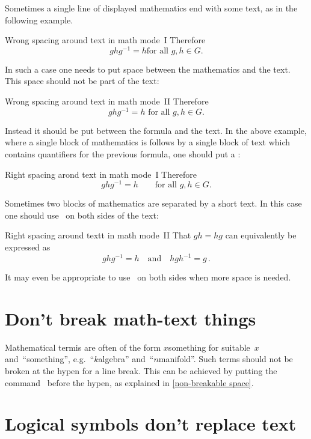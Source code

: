 Sometimes a single line of displayed mathematics end with some text, as in the following example.
\begin{showlatex}{Wrong spacing around text in math mode~I}
Therefore
\[
  g h g^{-1}
  =
  h
  \text{for all $g, h \in G$}.
\]
\end{showlatex}
In such a case one needs to put space between the mathematics and the text.
This space should not be part of the text:
\begin{showlatex}{Wrong spacing around text in math mode~II}
Therefore
\[
  g h g^{-1}
  =
  h
  \text{ for all $g, h \in G$.}
\]
\end{showlatex}
Instead it should be put between the formula and the text.
In the above example, where a single block of mathematics is follows by a single block of text which contains quantifiers for the previous formula, one should put a :
\begin{showlatex}{Right spacing arond text in math mode~I}
Therefore
\[
  g h g^{-1}
  =
  h
  \qquad
  \text{for all $g, h \in G$.}
\]
\end{showlatex}
Sometimes two blocks of mathematics are separated by a short text.
In this case one should use~ on both sides of the text:
\begin{showlatex}{Right spacing around textt in math mode~II}
That $gh = hg$ can equivalently be expressed as
\[
  g h g^{-1} = h
  \quad\text{and}\quad
  h g h^{-1} = g \,.
\]
\end{showlatex}
It may even be appropriate to use~ on both sides when more space is needed.





\section{Don’t break math-text things}

Mathematical termis are often of the form $x${\nbh}something for suitable~$x$ and~\enquote{something}, e.g.~\enquote{$k${\nbh}algebra} and~\enquote{$n${\nbh}manifold}.
Such terms should not be broken at the hypen for a line break.
This can be achieved by putting the command~ before the hypen, as explained in \cref{non-breakable space}.





\section{Logical symbols don’t replace text}
\label{no logical symbols}

